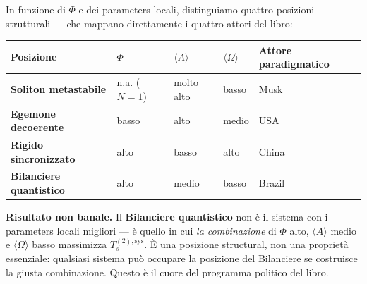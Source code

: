 In funzione di \(\Phi\) e dei parameters locali, distinguiamo quattro
posizioni strutturali --- che mappano direttamente i quattro attori del
libro:

{\def\LTcaptype{none} %
{\small\begin{longtable}[]{@{}
  >{\raggedright\arraybackslash}p{}
  >{\raggedright\arraybackslash}p{}
  >{\raggedright\arraybackslash}p{}
  >{\raggedright\arraybackslash}p{}
  >{\raggedright\arraybackslash}p{}@{}}
\toprule\noalign{}
\begin{minipage}[b]{\linewidth}\raggedright
Posizione
\end{minipage} & \begin{minipage}[b]{\linewidth}\raggedright
\(\Phi\)
\end{minipage} & \begin{minipage}[b]{\linewidth}\raggedright
\(\langle A\rangle\)
\end{minipage} & \begin{minipage}[b]{\linewidth}\raggedright
\(\langle\Omega\rangle\)
\end{minipage} & \begin{minipage}[b]{\linewidth}\raggedright
Attore paradigmatico
\end{minipage} \\
\midrule\noalign{}
\endhead
\bottomrule\noalign{}
\endlastfoot
\textbf{Soliton metastabile} & n.a. (\(N=1\)) & molto alto & basso &
Musk \\
\textbf{Egemone decoerente} & basso & alto & medio & USA \\
\textbf{Rigido sincronizzato} & alto & basso & alto & China \\
\textbf{Bilanciere quantistico} & alto & medio & basso & Brazil \\
\end{longtable}}
}

\Proved{} \textbf{Risultato non banale.} Il \textbf{Bilanciere
quantistico} non è il sistema con i parameters locali migliori --- è
quello in cui \emph{la combinazione} di \(\Phi\) alto,
\(\langle A\rangle\) medio e \(\langle\Omega\rangle\) basso massimizza
\(T_s^{(2),\text{sys}}\). È una posizione structural, non una proprietà
essenziale: qualsiasi sistema può occupare la posizione del Bilanciere
se costruisce la giusta combinazione. Questo è il cuore del programma
politico del libro.



